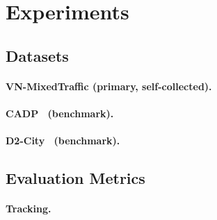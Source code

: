 
\section{Experiments}
\label{sec:experiments}

\subsection{Datasets}
\label{subsec:datasets}

\paragraph{VN-MixedTraffic (primary, self-collected).}

\paragraph{CADP~\cite{Shah2018_cadp} (benchmark).}

\paragraph{D2-City~\cite{Che2019_d2city} (benchmark).}


\subsection{Evaluation Metrics}
\label{subsec:metrics}

\paragraph{Tracking.}


